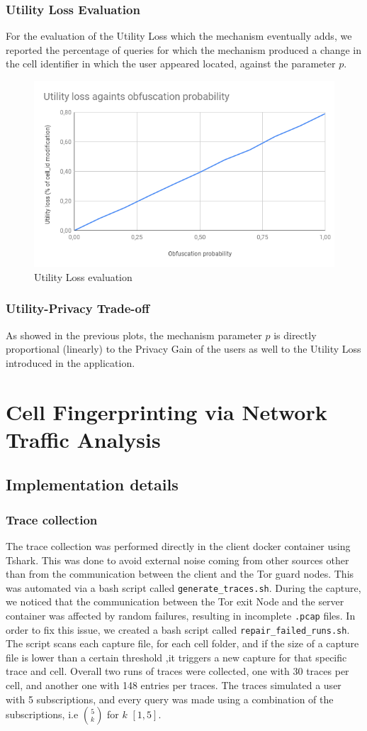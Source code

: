 \documentclass[10pt,conference,compsocconf]{IEEEtran}
\begin{document}
\subsubsection{Utility Loss Evaluation}
For the evaluation of the Utility Loss which the mechanism eventually adds, we
reported the percentage of queries for which the mechanism produced a change in
the cell identifier in which the user appeared located, against the parameter
$p$.
\begin{figure}[h!]
    \centering
    \includegraphics[width=0.5\linewidth]{../privacy_evaluation/defence_evaluation/utility_loss.png}
    \caption{Utility Loss evaluation}
\end{figure}
\subsubsection{Utility-Privacy Trade-off}
As showed in the previous plots, the mechanism parameter $p$ is directly
proportional (linearly) to the Privacy Gain of the users as well to the Utility
Loss introduced in the application.
\section{Cell Fingerprinting via Network Traffic Analysis}

\subsection{Implementation details}

\subsubsection{Trace collection}
The trace collection was performed directly in the client docker container using Tshark.
This was done to avoid external noise coming from other sources other than from the communication between the client and the Tor guard nodes.
This was automated via a bash script called \texttt{generate\_traces.sh}. During the capture, we noticed that the communication between
the Tor exit Node and the server container was affected by random failures, resulting in incomplete \texttt{.pcap} files. In order to fix this issue,
 we created a bash script called \texttt{repair\_failed\_runs.sh}. The script scans each capture file, for each cell folder, and if the size of a capture file
is lower than a certain threshold ,it triggers a new capture for that specific trace and cell. Overall two runs of traces
were collected, one with 30 traces per cell, and another one with 148 entries per traces.
The traces simulated a user with 5 subscriptions, and every query was made using a combination of the subscriptions, i.e $\binom{5}{k}$ for $k$ \in $[1,5]$.
\end{document}
